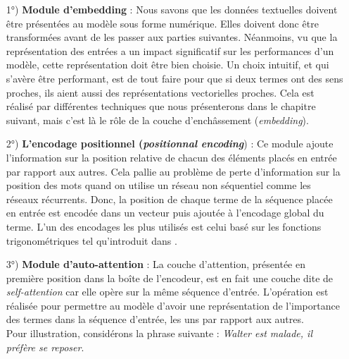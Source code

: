 \begin{itemize}
\item[1°)] \textbf{Module d'embedding} : Nous savons que les données textuelles doivent être présentées au modèle sous forme numérique. Elles doivent donc être transformées avant de les passer aux parties suivantes. Néanmoins, vu que la représentation des entrées a un impact significatif sur les performances d'un modèle, cette représentation doit être bien choisie. Un choix intuitif, et qui s'avère être performant, est de tout faire pour que si deux termes ont des sens proches, ils aient aussi des représentations vectorielles proches. Cela est réalisé par différentes techniques que nous présenterons dans le chapitre suivant, mais c'est là le rôle de la couche d'enchâssement (\textit{embedding}).
\item[2°)] \textbf{L'encodage positionnel (\textit{positionnal encoding}}) : Ce module ajoute l'information sur la position relative de chacun des éléments placés en entrée par rapport aux autres. Cela pallie au problème de perte d'information sur la position des mots quand on utilise un réseau non séquentiel comme les réseaux récurrents. Donc, la position de chaque terme de la séquence placée en entrée est encodée dans un vecteur puis ajoutée à l'encodage global du terme. L'un des encodages les plus utilisés est celui basé sur les fonctions trigonométriques tel qu'introduit dans \cite{vaswani2017attention}.
\item[3°)] \textbf{Module d'auto-attention} :
La couche d'attention, présentée en première position dans la boîte de l'encodeur, est en fait une couche dite de \textit{self-attention} car elle opère sur la même séquence d'entrée. L'opération est réalisée pour permettre au modèle d'avoir une représentation de l'importance des termes dans la séquence d'entrée, les uns par rapport aux autres.\\
Pour illustration, considérons la phrase suivante : \textit{Walter est malade, il préfère se reposer}.\\

\end{itemize}
